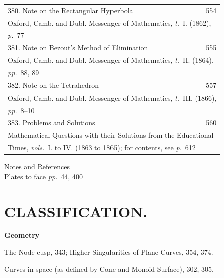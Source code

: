 \documentclass[11pt,a4paper]{article}
\newcommand{\vols}{\textit{vols.}}
\newcommand{\tome}{\textit{t.}}
\newcommand{\page}{\textit{p.}}
\newcommand{\pages}{\textit{pp.}}
\begin{document}
\begin{longtable}{p{4.5in}r}
380. Note on the Rectangular Hyperbola & 554 \\[-0.3em]
\multicolumn{2}{l}{\quad\small Oxford, Camb. and Dubl. Messenger of Mathematics, \tome~I. (1862),} \\[-0.3em]
\multicolumn{2}{l}{\quad\small \page~77} \\[0.5em]

381. Note on Bezout's Method of Elimination & 555 \\[-0.3em]
\multicolumn{2}{l}{\quad\small Oxford, Camb. and Dubl. Messenger of Mathematics, \tome~II. (1864),} \\[-0.3em]
\multicolumn{2}{l}{\quad\small \pages~88, 89} \\[0.5em]

382. Note on the Tetrahedron & 557 \\[-0.3em]
\multicolumn{2}{l}{\quad\small Oxford, Camb. and Dubl. Messenger of Mathematics, \tome~III. (1866),} \\[-0.3em]
\multicolumn{2}{l}{\quad\small \pages~8--10} \\[0.5em]

383. Problems and Solutions & 560 \\[-0.3em]
\multicolumn{2}{l}{\quad\small Mathematical Questions with their Solutions from the Educational} \\[-0.3em]
\multicolumn{2}{l}{\quad\small Times, \vols~I. to IV. (1863 to 1865); for contents, see \page~612} \\[0.5em]
\end{longtable}

\begin{center}
Notes and References  \\[0.5em]
Plates  \quad to face \pages~44, 400
\end{center}

\clearpage

\section*{CLASSIFICATION.}

\textbf{Geometry}

The Node-cusp, 343; Higher Singularities of Plane Curves, 354, 374.

Curves in space (as defined by Cone and Monoid Surface), 302, 305.
\end{document}
